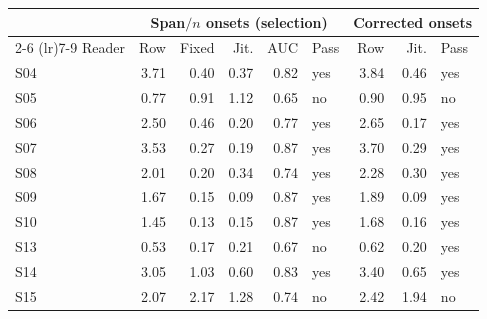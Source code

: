 \begin{tabular}{lrrrrlrrl}
\toprule
 & \multicolumn{5}{c}{Span$/n$ onsets (selection)} & \multicolumn{3}{c}{Corrected onsets} \\
\cmidrule(lr){2-6} \cmidrule(lr){7-9}
Reader & Row & Fixed & Jit. & AUC & Pass & Row & Jit. & Pass \\
\midrule
S04 & 3.71 & 0.40 & 0.37 & 0.82 & yes & 3.84 & 0.46 & yes \\
S05 & 0.77 & 0.91 & 1.12 & 0.65 & no & 0.90 & 0.95 & no \\
S06 & 2.50 & 0.46 & 0.20 & 0.77 & yes & 2.65 & 0.17 & yes \\
S07 & 3.53 & 0.27 & 0.19 & 0.87 & yes & 3.70 & 0.29 & yes \\
S08 & 2.01 & 0.20 & 0.34 & 0.74 & yes & 2.28 & 0.30 & yes \\
S09 & 1.67 & 0.15 & 0.09 & 0.87 & yes & 1.89 & 0.09 & yes \\
S10 & 1.45 & 0.13 & 0.15 & 0.87 & yes & 1.68 & 0.16 & yes \\
S13 & 0.53 & 0.17 & 0.21 & 0.67 & no & 0.62 & 0.20 & yes \\
S14 & 3.05 & 1.03 & 0.60 & 0.83 & yes & 3.40 & 0.65 & yes \\
S15 & 2.07 & 2.17 & 1.28 & 0.74 & no & 2.42 & 1.94 & no \\
\bottomrule
\end{tabular}
